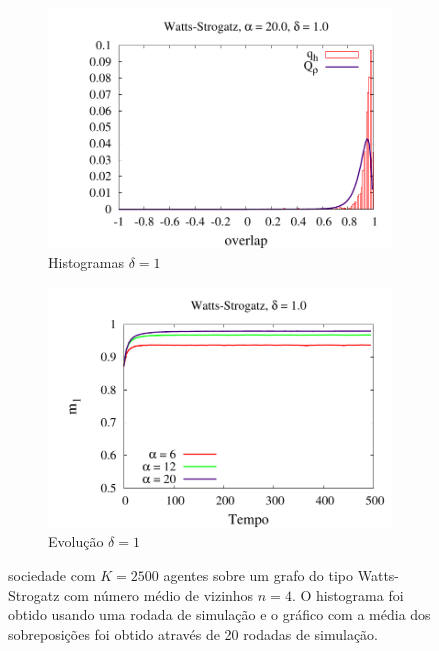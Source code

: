 \begin{figure}
\begin{subfigure}[]{0.7\textwidth}
        \includegraphics[width=\textwidth]{Figures/HistoDeltaD1Beta20}
        \caption{Histogramas $\delta = 1$}
    \end{subfigure}
    \begin{subfigure}[]{0.7\textwidth}
        \centering
        \includegraphics[width=\textwidth]{Figures/MagD1Beta}
        \caption{Evolução $\delta = 1$}
    \end{subfigure}
    \newline
    \caption{
        sociedade com $K=2500$ agentes sobre um grafo do tipo Watts-Strogatz
        com número médio de vizinhos $n=4$. O histograma foi obtido usando uma
        rodada de simulação e o gráfico com a média dos sobreposições foi obtido
        através de 20 rodadas de simulação.
        }
    \label{fig:DDSeparado}
\end{figure}

